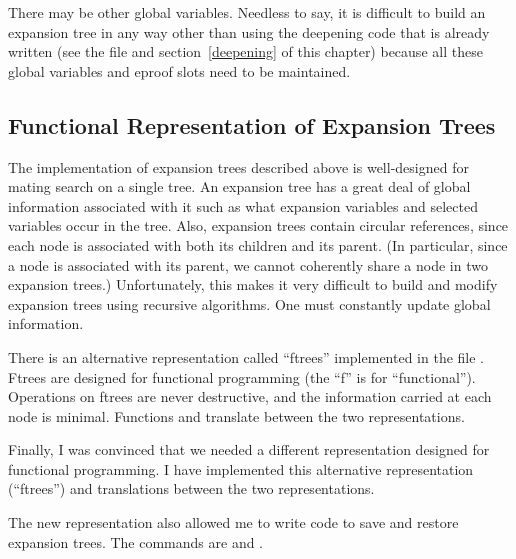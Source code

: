 There may be other global variables.  Needless to say, it is difficult to build an
expansion tree in any way other than using the deepening code that is already written
(see the file  and section~\ref{deepening} of this chapter)
because all these global variables
and eproof slots need to be maintained.


\subsection{Functional Representation of Expansion Trees}\label{ftrees}

The implementation of expansion trees described above
is well-designed for mating
search on a single tree.  An expansion tree has a great deal of global information
associated with it such as what expansion variables and selected variables
occur in the tree.  Also, expansion trees contain circular references, since
each node is associated with both its children and its parent.
(In particular, since a node is associated with its parent, we
cannot coherently share a node in two expansion trees.)
Unfortunately, this makes it very difficult to build
and modify expansion trees using recursive algorithms.
One must constantly update global information.

There is an alternative representation called ``ftrees'' implemented
in the file .  Ftrees are designed for functional
programming (the ``f'' is for ``functional'').  Operations on
ftrees are never destructive, and the information carried at
each node is minimal.  Functions 
and 
translate between the two representations.

Finally, I was convinced that we needed a different representation
designed for functional programming.  I have implemented this
alternative representation (``ftrees'') and translations between the two representations.

The new representation also allowed me to write code to save and restore
expansion trees.  The commands are
 and
.

